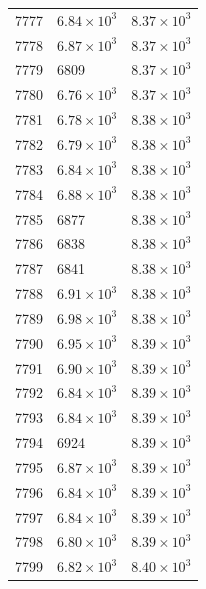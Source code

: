 \begin{table}[H]
\begin{tabular}{lll}
7777 & $\displaystyle 6.84 \times 10^{3}$ & $\displaystyle 8.37 \times 10^{3}$ \\
7778 & $\displaystyle 6.87 \times 10^{3}$ & $\displaystyle 8.37 \times 10^{3}$ \\
7779 & 6809 & $\displaystyle 8.37 \times 10^{3}$ \\
7780 & $\displaystyle 6.76 \times 10^{3}$ & $\displaystyle 8.37 \times 10^{3}$ \\
7781 & $\displaystyle 6.78 \times 10^{3}$ & $\displaystyle 8.38 \times 10^{3}$ \\
7782 & $\displaystyle 6.79 \times 10^{3}$ & $\displaystyle 8.38 \times 10^{3}$ \\
7783 & $\displaystyle 6.84 \times 10^{3}$ & $\displaystyle 8.38 \times 10^{3}$ \\
7784 & $\displaystyle 6.88 \times 10^{3}$ & $\displaystyle 8.38 \times 10^{3}$ \\
7785 & 6877 & $\displaystyle 8.38 \times 10^{3}$ \\
7786 & 6838 & $\displaystyle 8.38 \times 10^{3}$ \\
7787 & 6841 & $\displaystyle 8.38 \times 10^{3}$ \\
7788 & $\displaystyle 6.91 \times 10^{3}$ & $\displaystyle 8.38 \times 10^{3}$ \\
7789 & $\displaystyle 6.98 \times 10^{3}$ & $\displaystyle 8.38 \times 10^{3}$ \\
7790 & $\displaystyle 6.95 \times 10^{3}$ & $\displaystyle 8.39 \times 10^{3}$ \\
7791 & $\displaystyle 6.90 \times 10^{3}$ & $\displaystyle 8.39 \times 10^{3}$ \\
7792 & $\displaystyle 6.84 \times 10^{3}$ & $\displaystyle 8.39 \times 10^{3}$ \\
7793 & $\displaystyle 6.84 \times 10^{3}$ & $\displaystyle 8.39 \times 10^{3}$ \\
7794 & 6924 & $\displaystyle 8.39 \times 10^{3}$ \\
7795 & $\displaystyle 6.87 \times 10^{3}$ & $\displaystyle 8.39 \times 10^{3}$ \\
7796 & $\displaystyle 6.84 \times 10^{3}$ & $\displaystyle 8.39 \times 10^{3}$ \\
7797 & $\displaystyle 6.84 \times 10^{3}$ & $\displaystyle 8.39 \times 10^{3}$ \\
7798 & $\displaystyle 6.80 \times 10^{3}$ & $\displaystyle 8.39 \times 10^{3}$ \\
7799 & $\displaystyle 6.82 \times 10^{3}$ & $\displaystyle 8.40 \times 10^{3}$ \\

\end{tabular}
\end{table}
